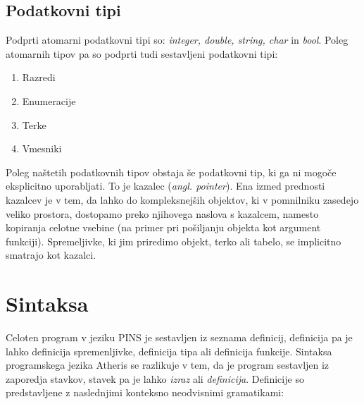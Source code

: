 \documentclass[a4paper, 12p]{book}
\begin{document}
\subsection{Podatkovni tipi}

Podprti atomarni podatkovni tipi so: \textit{integer, double, string, char} in \textit{bool}. Poleg atomarnih tipov pa so podprti tudi sestavljeni podatkovni tipi:

\begin{enumerate}
	\item Razredi
	\item Enumeracije
	\item Terke
	\item Vmesniki
\end{enumerate}

Poleg naštetih podatkovnih tipov obstaja še podatkovni tip, ki ga ni mogoče eksplicitno uporabljati. To je kazalec (\textit{angl. pointer}). Ena izmed prednosti kazalcev je v tem, da lahko do kompleksnejših objektov, ki v pomnilniku zasedejo veliko prostora, dostopamo preko njihovega naslova s kazalcem, namesto kopiranja celotne vsebine (na primer pri pošiljanju objekta kot argument funkciji). Spremeljivke, ki jim priredimo objekt, terko ali tabelo, se implicitno smatrajo kot kazalci. \\

\section{Sintaksa}

Celoten program v jeziku PINS je sestavljen iz seznama definicij, definicija pa je lahko definicija spremenljivke, definicija tipa ali definicija funkcije. Sintaksa programskega jezika Atheris se razlikuje v tem, da je program sestavljen iz zaporedja stavkov, stavek pa je lahko \textit{izraz} ali \textit{definicija}. Definicije so predstavljene z naslednjimi konteksno neodvisnimi gramatikami:
\end{document}
